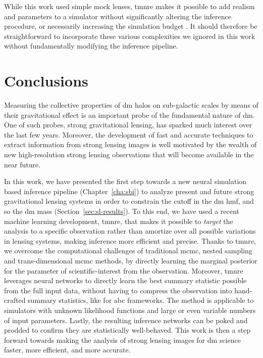 While this work used simple mock lenses, \gls*{tmnre} makes it possible to add realism and parameters to a simulator without significantly altering the inference procedure, or necessarily increasing the simulation budget \cite{Cole:2021gwr}. It should therefore be straightforward to incorporate these various complexities we ignored in this work without fundamentally modifying the inference pipeline. 



\section{Conclusions}\label{sec:sl-conclusions}

Measuring the collective properties of \gls*{dm} halos on sub-galactic scales by means of their gravitational effect is an important probe of the fundamental nature of \gls*{dm}. One of such probes, strong gravitational lensing, has sparked much interest over the last few years. Moreover, the development of fast and accurate techniques to extract information from strong lensing images is well motivated by the wealth of new high-resolution strong lensing observations that will become available in the near future.

In this work, we have presented the first step towards a new neural simulation based inference pipeline (Chapter~\ref{cha:sbi}) to analyze present and future strong gravitational lensing systems in order to constrain the cutoff in the \gls*{dm} \gls*{hmf}, and so the \gls*{dm} mass (Section~\ref{sec:sl-results}). To this end, we have used a recent machine learning development, \gls*{tmnre}, that makes it possible to \textit{target} the analysis to a specific observation rather than amortize over all possible variations in lensing systems, making inference more efficient and precise. Thanks to \gls*{tmnre}, we overcome the computational challenges of traditional \gls*{mcmc}, nested sampling and trans-dimensional \gls*{mcmc} methods, by directly learning the marginal posterior for the parameter of scientific-interest from the observation. Moreover, \gls*{tmnre} leverages neural networks to directly learn the best summary statistic possible from the full input data, without having to compress the observation into hand-crafted summary statistics, like for \gls*{abc} frameworks. The method is applicable to simulators with unknown likelihood functions and large or even variable numbers of input parameters. Lastly, the resulting inference networks can be poked and prodded to confirm they are statistically well-behaved.
This work is then a step forward towards making the analysis of strong lensing images for \gls*{dm} science faster, more efficient, and more accurate. 


